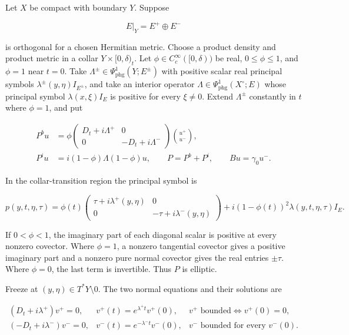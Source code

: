 \documentclass[
  11pt,
]{article}
\begin{document}
Let \(X\) be compact with boundary \(Y\). Suppose

\[
 E|_Y=E^+\oplus E^-
 \tag{DI1}
\]

is orthogonal for a chosen Hermitian metric. Choose a product density
and product metric in a collar \(Y\times[0,\delta)_t\). Let
\(\phi\in C_c^\infty([0,\delta))\) be real, \(0\leq\phi\leq1\), and
\(\phi=1\) near \(t=0\). Take
\(\Lambda^\pm\in\Psi_{\mathrm{phg}}^1(Y;E^\pm)\) with positive scalar
real principal symbols \(\lambda^\pm(y,\eta)I_{E^\pm}\), and take an
interior operator \(\Lambda\in\Psi_{\mathrm{phg}}^1(X^\circ;E)\) whose
principal symbol \(\lambda(x,\xi)I_E\) is positive for every
\(\xi\ne0\). Extend \(\Lambda^\pm\) constantly in \(t\) where
\(\phi=1\), and put

\[
 \begin{aligned}
 P^bu&=\phi
 \begin{pmatrix}
  D_t+i\Lambda^+&0\\
  0&-D_t+i\Lambda^-
 \end{pmatrix}
 \binom{u^+}{u^-},\\
 P^iu&=i(1-\phi)\Lambda(1-\phi)u,\qquad
 P=P^b+P^i,\qquad Bu=\gamma_0u^-.
 \end{aligned}
 \tag{DI2}
\]

In the collar-transition region the principal symbol is

\[
 p(y,t,\eta,\tau)=
 \phi(t)
 \begin{pmatrix}
  \tau+i\lambda^+(y,\eta)&0\\
  0&-\tau+i\lambda^-(y,\eta)
 \end{pmatrix}
 +i(1-\phi(t))^2\lambda(y,t,\eta,\tau)I_E.
 \tag{DI3}
\]

If \(0<\phi<1\), the imaginary part of each diagonal scalar is positive
at every nonzero covector. Where \(\phi=1\), a nonzero tangential
covector gives a positive imaginary part and a nonzero pure normal
covector gives the real entries \(\pm\tau\). Where \(\phi=0\), the last
term is invertible. Thus \(P\) is elliptic.

Freeze at \((y,\eta)\in T^*Y\setminus0\). The two normal equations and
their solutions are

\[
 \begin{array}{lll}
 (D_t+i\lambda^+)v^+=0,
 &v^+(t)=e^{\lambda^+t}v^+(0),
 &v^+\text{ bounded}\Longleftrightarrow v^+(0)=0,\\[1mm]
 (-D_t+i\lambda^-)v^-=0,
 &v^-(t)=e^{-\lambda^-t}v^-(0),
 &v^-\text{ bounded for every }v^-(0).
 \end{array}
 \tag{DI4}
\]
\end{document}
